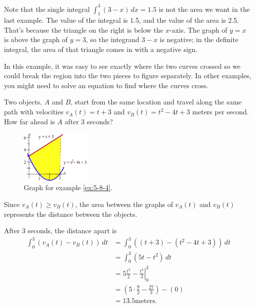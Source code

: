 Note that the single integral $\displaystyle\int_1^3(3-x)\,dx=1.5$ is not the area we want in the last example. The value of the integral is 1.5, and the value of the area is 2.5. That's because the triangle on the right is below the $x$-axis. The graph of $y=x$ is above the graph of $y=3$, so the integrand $3-x$ is negative; in the definite integral, the area of that triangle comes in with a negative sign.

In this example, it was easy to see exactly where the two curves crossed so we could break the region into the two pieces to figure separately. In other examples, you might need to solve an equation to find where the curves cross.

\begin{example}
  \label{ex:5-8-4}
Two objects, $A$ and $B$, start from the same location and travel along the same path with velocities $v_A(t)=t+3$ and $v_B(t)=t^2-4t+3$ meters per second. How far ahead is $A$ after 3 seconds?

\begin{figure}[!ht]
  \centering
    \includegraphics[width=0.3\textwidth]{img/chap5/image051.png}
    \caption{Graph for example \ref{ex:5-8-4}.}
    \label{fig:5-8-ex4}
\end{figure}

\begin{solution}

Since $v_A(t)\geq v_B(t)$, the area between the graphs of $v_A(t)$ and $v_B(t)$ represents the distance between the objects.

After 3 seconds, the distance apart is
\begin{align*}
\int_0^3(v_A(t)-v_B(t))\,dt &= \int_0^3((t+3)-(t^2-4t+3))\,dt \\
  &= \int_0^3(5t-t^2)\,dt \\
  &= \left.5\frac{t^2}{2}-\frac{t^3}{3}\right|_0^3 \\
  &= \left(5\cdot\frac{9}{2} - \frac{27}{3}\right)-(0)\\
  &= 13.5 \text{meters}.
\end{align*}
\end{solution}\end{example}

